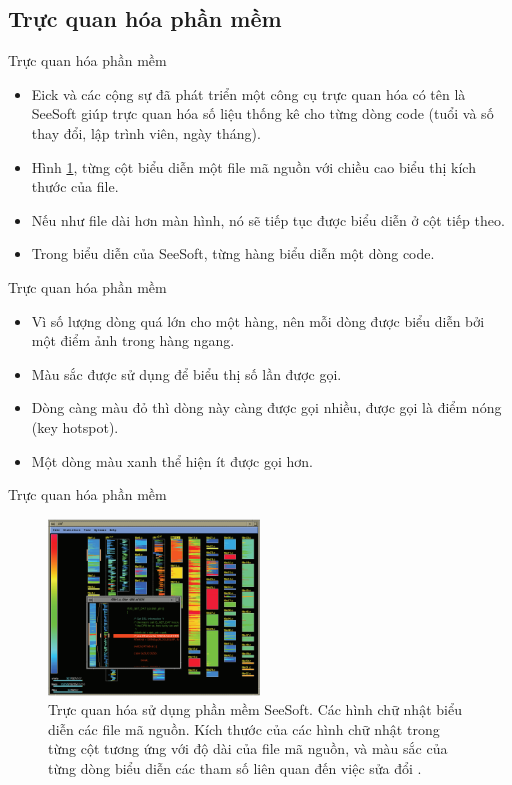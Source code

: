 \documentclass[10pt]{beamer}
\theoremstyle{remark}
\theoremstyle{definition}
\begin{document}
\subsection{Trực quan hóa phần mềm}

\begin{frame}{Trực quan hóa phần mềm}
	\begin{itemize}
		\item Eick và các cộng sự đã phát triển một công cụ trực quan hóa có tên là SeeSoft \cite{108} giúp trực quan hóa số liệu thống kê cho từng dòng code (tuổi và số thay đổi, lập trình viên, ngày tháng).
		\item Hình \ref{fig:13}, từng cột biểu diễn một file mã nguồn với chiều cao biểu thị kích thước của file.
		\item Nếu như file dài hơn màn hình, nó sẽ tiếp tục được biểu diễn ở cột tiếp theo.
		\item Trong biểu diễn của SeeSoft, từng hàng biểu diễn một dòng code.
	\end{itemize}
\end{frame}

\begin{frame}{Trực quan hóa phần mềm}
	\begin{itemize}
		\item Vì số lượng dòng quá lớn cho một hàng, nên mỗi dòng được biểu diễn bởi một điểm ảnh trong hàng ngang.
		\item Màu sắc được sử dụng để biểu thị số lần được gọi.
		\item Dòng càng màu đỏ thì dòng này càng được gọi nhiều, được gọi là điểm nóng (key hotspot).
		\item Một dòng màu xanh thể hiện ít được gọi hơn.
	\end{itemize}
\end{frame}

\begin{frame}{Trực quan hóa phần mềm}
	\begin{figure}[h!]
        \centering
        \includegraphics[width=0.5\textwidth]{13.png}
        \caption{Trực quan hóa sử dụng phần mềm SeeSoft. Các hình chữ nhật biểu diễn các file mã nguồn.
        Kích thước của các hình chữ nhật trong từng cột tương ứng với độ dài của file mã nguồn, và màu sắc của từng dòng biểu diễn các tham số liên quan đến việc sửa đổi \cite{108}.}
        \label{fig:13}
    \end{figure}
\end{frame}
\end{document}

